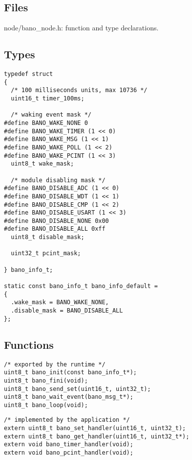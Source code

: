 \documentclass[a4paper, 11pt]{article}
\begin{document}
\subsection{Files}
node/bano\_node.h: function and type declarations.

\subsection{Types}
\begin{scriptsize}
\begin{verbatim}
typedef struct
{
  /* 100 milliseconds units, max 10736 */
  uint16_t timer_100ms;

  /* waking event mask */
#define BANO_WAKE_NONE 0
#define BANO_WAKE_TIMER (1 << 0)
#define BANO_WAKE_MSG (1 << 1)
#define BANO_WAKE_POLL (1 << 2)
#define BANO_WAKE_PCINT (1 << 3)
  uint8_t wake_mask;

  /* module disabling mask */
#define BANO_DISABLE_ADC (1 << 0)
#define BANO_DISABLE_WDT (1 << 1)
#define BANO_DISABLE_CMP (1 << 2)
#define BANO_DISABLE_USART (1 << 3)
#define BANO_DISABLE_NONE 0x00
#define BANO_DISABLE_ALL 0xff
  uint8_t disable_mask;

  uint32_t pcint_mask;

} bano_info_t;

static const bano_info_t bano_info_default =
{
  .wake_mask = BANO_WAKE_NONE,
  .disable_mask = BANO_DISABLE_ALL
};
\end{verbatim}
\end{scriptsize}


\subsection{Functions}
\begin{scriptsize}
\begin{verbatim}
/* exported by the runtime */
uint8_t bano_init(const bano_info_t*);
uint8_t bano_fini(void);
uint8_t bano_send_set(uint16_t, uint32_t);
uint8_t bano_wait_event(bano_msg_t*);
uint8_t bano_loop(void);
\end{verbatim}
\end{scriptsize}

\begin{scriptsize}
\begin{verbatim}
/* implemented by the application */
extern uint8_t bano_set_handler(uint16_t, uint32_t);
extern uint8_t bano_get_handler(uint16_t, uint32_t*);
extern void bano_timer_handler(void);
extern void bano_pcint_handler(void);
\end{verbatim}
\end{scriptsize}
\end{document}
